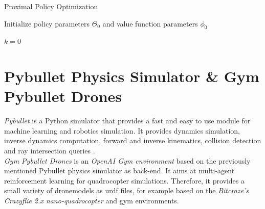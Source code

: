 \begin{algorithm}
	\caption{Proximal Policy Optimization \cite{schulman2017proximal}}
	\label{alg:ppo}

	Initialize policy parameters $\Theta_0$ and value function parameters $\phi_0$
	
	$k = 0$
	
\end{algorithm}

\newpage

\section{Pybullet Physics Simulator \& Gym Pybullet Drones}
\emph{Pybullet}  is a Python simulator that provides a fast and easy to use module for machine learning and robotics simulation. It provides dynamics simulation, inverse dynamics computation, forward and inverse kinematics, collision detection and ray intersection queries \cite{coumans2021}. \\
\emph{Gym Pybullet Drones} \cite{panerati2021learning} is an \emph{OpenAI Gym environment} based on the previously mentioned Pybullet physics simulator as back-end. It aims at multi-agent reinforcement learning for quadrocopter simulations. Therefore, it provides a small variety of dronemodels as urdf files, for example based on the \emph{Bitcraze's Crazyflie 2.x nano-quadrocopter} and gym environments.\\

